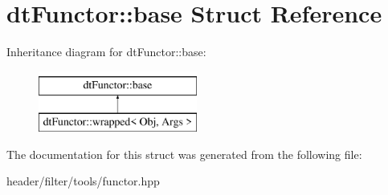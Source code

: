 \hypertarget{structdt_functor_1_1base}{}\section{dt\+Functor\+:\+:base Struct Reference}
\label{structdt_functor_1_1base}
Inheritance diagram for dt\+Functor\+:\+:base\+:\begin{figure}[H]
\begin{center}
\leavevmode
\includegraphics[height=2.000000cm]{d3/df6/structdt_functor_1_1base}
\end{center}
\end{figure}


The documentation for this struct was generated from the following file\+:\begin{DoxyCompactItemize}
\item 
header/filter/tools/functor.\+hpp\end{DoxyCompactItemize}

